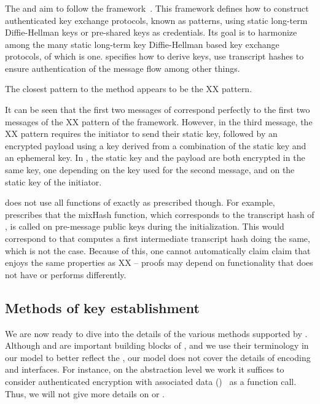 \subsubsection{\mNoise{}}
The \mStatStat{} and \mPskPsk{} aim to follow the \mNoise{}
framework~\cite{perrin2016noise}.
%
This framework defines how to construct authenticated key exchange protocols,
known as patterns, using static long-term Diffie-Hellman keys or pre-shared
keys as credentials.
%
Its goal is to harmonize among the many static long-term key Diffie-Hellman 
based key exchange protocols, of which \mOptls{} is one.
%
\mNoise{} specifies how to derive keys, use transcript hashes to ensure
authentication of the message flow among other things.
%

The closest \mNoise{} pattern to the \mStatStat{} method appears to be the
XX pattern.
%

{\color{blue}
It can be seen that the first two messages of \mStatStat{}
correspond perfectly to the first two messages of the XX pattern of
the \mNoise{} framework.
%
However, in the third message, the XX pattern requires
the initiator to send their static key, followed by an encrypted payload using a
key derived from a combination of the static key and an ephemeral key.
%
In \mEdhoc{}, the static key and the payload are both encrypted in the same key, one depending on the key used for the second message, and on the static key of the initiator.
}

\mEdhoc{} does not use all functions of \mNoise{} exactly as prescribed though.
%
For example, \mNoise{} prescribes that the mixHash function, which corresponds
to the transcript hash of \mEdhoc{}, is called on pre-message public keys
during the initialization.
%
This would correspond to that \mEdhoc{} computes a first intermediate transcript
hash doing the same, which is not the case.
%
Because of this, one cannot automatically claim claim that \mEdhoc{} enjoys
the same properties as XX -- proofs may depend on functionality that \mEdhoc{}
does not have or performs differently.
%

\subsection{Methods of key establishment}
\label{sec:methods}
We are now ready to dive into the details of the various methods supported by
\mEdhoc.
%
Although \mCose{} and \mCbor{} are important building blocks of \mEdhoc{}, and
we use their terminology in our \mTamarin{} model to better reflect the
\mSpec{}, our model does not cover
the details of encoding and \mCose{} interfaces.
%
For instance, on the abstraction level we work it suffices to consider
authenticated encryption with associated data (\mAead{})~\cite{aead} as a
function call.
%
Thus, we will not give more details on \mCose{} or \mCbor{}.
%

